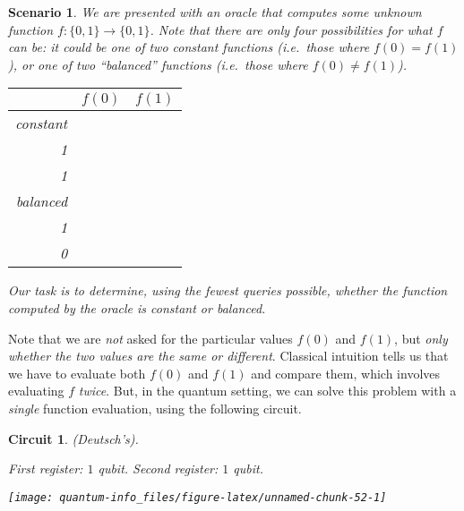 \documentclass[fleqn]{article}
\newtheorem*{scenario}{Scenario}
\newtheorem*{circuit}{Circuit}
\begin{document}
\begin{scenario}

We are presented with an oracle that computes some unknown function \(f\colon\{0,1\}\to\{0,1\}\).
Note that there are only four possibilities for what \(f\) can be: it could be one of two constant functions (i.e.~those where \(f(0)=f(1)\)), or one of two ``balanced'' functions (i.e.~those where \(f(0)\neq f(1)\)).

\begin{longtable}[]{@{}rcc@{}}
\toprule
& \(f(0)\) & \(f(1)\)\tabularnewline
\midrule
\endhead
constant & \(\begin{matrix}0\\1\end{matrix}\) & \(\begin{matrix}0\\1\end{matrix}\)\tabularnewline
balanced & \(\begin{matrix}0\\1\end{matrix}\) & \(\begin{matrix}1\\0\end{matrix}\)\tabularnewline
\bottomrule
\end{longtable}

Our task is to determine, using the fewest queries possible, whether the function computed by the oracle is constant or balanced.

\end{scenario}

Note that we are \emph{not} asked for the particular values \(f(0)\) and \(f(1)\), but \emph{only whether the two values are the same or different}.
Classical intuition tells us that we have to evaluate both \(f(0)\) and \(f(1)\) and compare them, which involves evaluating \(f\) \emph{twice}.
But, in the quantum setting, we can solve this problem with a \emph{single} function evaluation, using the following circuit.

\begin{circuit}

(Deutsch's).

\emph{First register: \(1\) qubit. Second register: \(1\) qubit.}

\begin{center}\texttt{[image: quantum-info\_files/figure-latex/unnamed-chunk-52-1]} \end{center}

\end{circuit}
\end{document}

